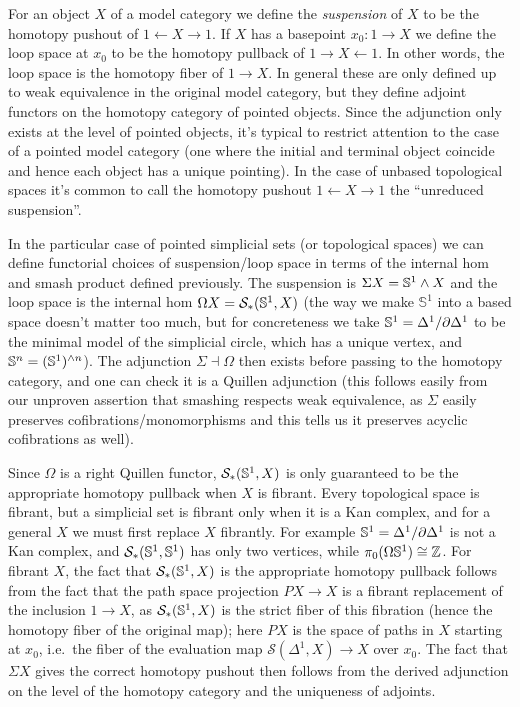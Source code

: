For an object \(X\) of a model category we define the \emph{suspension} of \(X\) to be the homotopy pushout of \(1 \leftarrow X \rightarrow 1\). If \(X\) has a basepoint \(x_0 : 1 \to X\) we define the loop space at \(x_0\) to be the homotopy pullback of \(1 \rightarrow X \leftarrow 1\). In other words, the loop space is the homotopy fiber of \(1 \to X\). In general these are only defined up to weak equivalence in the original model category, but they define adjoint functors on the homotopy category of pointed objects. Since the adjunction only exists at the level of pointed objects, it's typical to restrict attention to the case of a pointed model category (one where the initial and terminal object coincide and hence each object has a unique pointing). In the case of unbased topological spaces it's common to call the homotopy pushout \(1 \leftarrow X \rightarrow 1\) the ``unreduced suspension''.

In the particular case of pointed simplicial sets (or topological spaces) we can define functorial choices of suspension/loop space in terms of the internal hom and smash product defined previously. The suspension is \(\Sigma X = \S^1 \wedge X\) and the loop space is the internal hom \(\Omega X = \mathcal{S}_*(\S^1, X)\) (the way we make \(\mathbb{S}^1\) into a based space doesn't matter too much, but for concreteness we take \(\S^1 = \Delta^1/\partial\Delta^1\) to be the minimal model of the simplicial circle, which has a unique vertex, and \(\S^n = (\S^1)^{\wedge n}\)). The adjunction \(\Sigma \dashv \Omega\) then exists before passing to the homotopy category, and one can check it is a Quillen adjunction (this follows easily from our unproven assertion that smashing respects weak equivalence, as \(\Sigma\) easily preserves cofibrations/monomorphisms and this tells us it preserves acyclic cofibrations as well).

Since \(\Omega\) is a right Quillen functor, \(\mathcal{S}_*(\S^1, X)\) is only guaranteed to be the appropriate homotopy pullback when \(X\) is fibrant. Every topological space is fibrant, but a simplicial set is fibrant only when it is a Kan complex, and for a general \(X\) we must first replace \(X\) fibrantly. For example \(\S^1 = \Delta^1/\partial\Delta^1\) is not a Kan complex, and \(\mathcal{S}_*(\S^1, \S^1)\) has only two vertices, while \(\pi_0(\Omega \S^1) \cong \Z\). For fibrant \(X\), the fact that \(\mathcal{S}_*(\S^1, X)\) is the appropriate homotopy pullback follows from the fact that the path space projection \(PX \to X\) is a fibrant replacement of the inclusion \(1 \to X\), as \(\mathcal{S}_*(\S^1, X)\) is the strict fiber of this fibration (hence the homotopy fiber of the original map); here \(PX\) is the space of paths in \(X\) starting at \(x_0\), i.e.~the fiber of the evaluation map \(\mathcal{S}(\Delta^1, X) \to X\) over \(x_0\). The fact that \(\Sigma X\) gives the correct homotopy pushout then follows from the derived adjunction on the level of the homotopy category and the uniqueness of adjoints.

